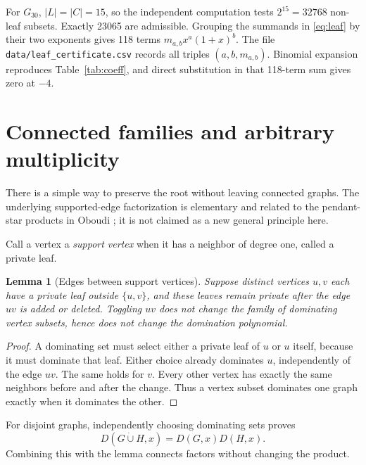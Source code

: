 \documentclass[11pt]{article}
\numberwithin{equation}{section}
\newtheorem{lemma}[theorem]{Lemma}
\theoremstyle{definition}
\newcommand{\D}{D}
\newcommand{\Gthirty}{G_{30}}
\begin{document}
For \(\Gthirty\), \(|L|=|C|=15\), so the independent computation tests
\(2^{15}=32768\) non-leaf subsets. Exactly 23065 are admissible.
Grouping the summands in \eqref{eq:leaf} by their two exponents gives
118 terms \(m_{a,b}x^a(1+x)^b\). The file
\texttt{data/leaf\_certificate.csv} records all triples \((a,b,m_{a,b})\).
Binomial expansion reproduces Table~\ref{tab:coeff}, and direct
substitution in that 118-term sum gives zero at \(-4\).

\section{Connected families and arbitrary multiplicity}\label{sec:families}

There is a simple way to preserve the root without leaving connected
graphs. The underlying supported-edge factorization is elementary and
related to the pendant-star products in Oboudi \cite{Oboudi}; it is not
claimed as a new general principle here.

Call a vertex a \emph{support vertex} when it has a neighbor of degree
one, called a private leaf.

\begin{lemma}[Edges between support vertices]\label{lem:support}
Suppose distinct vertices \(u,v\) each have a private leaf outside
\(\{u,v\}\), and these leaves remain private after the edge \(uv\) is
added or deleted. Toggling \(uv\) does not change the
family of dominating vertex subsets, hence does not change the
domination polynomial.
\end{lemma}
\begin{proof}
A dominating set must select either a private leaf of \(u\) or \(u\)
itself, because it must dominate that leaf. Either choice already
dominates \(u\), independently of the edge \(uv\). The same holds for
\(v\). Every other vertex has exactly the same neighbors before and
after the change. Thus a vertex subset dominates one graph exactly
when it dominates the other.
\end{proof}

For disjoint graphs, independently choosing dominating sets proves
\begin{equation}\label{eq:product}
 \D(G\mathbin{\dot\cup}H,x)=\D(G,x)\D(H,x).
\end{equation}
Combining this with the lemma connects factors without changing the
product.
\end{document}
